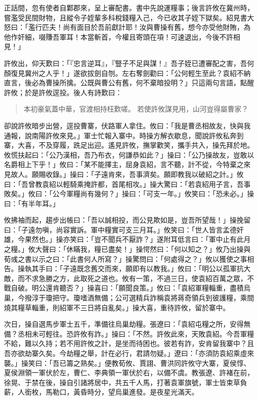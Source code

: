 正話間，忽有使者自鄴郡來，呈上審配書。書中先說運糧事；後言許攸在冀州時，嘗濫受民間財物，且縱令子姪輩多科稅錢糧入己，今已收其子姪下獄矣。紹見書大怒曰：「濫行匹夫！尚有面目於吾前獻計耶！汝與曹操有舊，想今亦受他財賄，為他作奸細，啜賺吾軍耳！本當斬首，今權且寄頭在項！可速退出，今後不許相見！」

許攸出，仰天歎曰：「『忠言逆耳』，『豎子不足與謀！』吾子姪已遭審配之害，吾何顏復見冀州之人乎！」遂欲拔劍自刎。左右奪劍勸曰：「公何輕生至此？袁紹不納直言，後必為曹操所擒。公既與曹公有舊，何不棄暗投明？」只這兩句言語，點醒許攸；於是許攸逕投。後人有詩歎曰：

\begin{quote}
本初豪氣蓋中華，官渡相持枉歎嗟。
若使許攸謀見用，山河豈得屬曹家？
\end{quote}

卻說許攸暗步出營，逕投曹寨，伏路軍人拿住。攸曰：「我是曹丞相故友，快與我通報，說南陽許攸來見。」軍士忙報入寨中。時操方解衣歇息，聞說許攸私奔到寨，大喜，不及穿履，跣足出迎。遙見許攸，撫掌歡笑，攜手共入，操先拜於地。攸慌扶起曰：「公乃漢相，吾乃布衣，何謙恭如此？」操曰：「公乃操故友，豈敢以名爵相上下乎！」攸曰：「某不能擇主，屈身袁紹，言不聽，計不從，今特棄之來見故人。願賜收錄。」操曰：「子遠肯來，吾事濟矣。願即教我以破紹之計。」攸曰：「吾曾教袁紹以輕騎乘掩許都，首尾相攻。」操大驚曰：「若袁紹用子言，吾事敗矣。」攸曰：「公今軍糧尚有幾何？」操曰：「可支一年。」攸笑曰：「恐未必。」操曰：「有半年耳。」

攸拂袖而起，趨步出帳曰：「吾以誠相投，而公見欺如是，豈吾所望哉！」操挽留曰：「子遠勿嗔，尚容實訴。軍中糧實可支三月耳。」攸笑曰：「世人皆言孟德奸雄，今果然也。」操亦笑曰：「豈不聞兵不厭詐？」遂附耳低言曰：「軍中止有此月之糧。」攸大聲曰：「休瞞我，糧已盡矣！」操愕然曰：「何以知之？」攸乃出操與荀彧之書以示之曰：「此書何人所寫？」操驚問曰：「何處得之？」攸以獲使之事相告。操執其手曰：「子遠既念舊交而來，願即有以教我。」攸曰：「明公以孤軍抗大敵，而不求急勝之方，此取死之道也。攸有一策，不過三日，使袁紹百萬之眾，不戰自破。明公還肯聽否？」操喜曰：「願聞良策。」攸曰：「袁紹軍糧輜重，盡積烏巢，今撥淳于瓊把守。瓊嗜酒無備；公可選精兵詐稱袁將蔣奇領兵到彼護糧，乘間燒其糧草輜重，則紹軍不三日將自亂矣。」操大喜，重待許攸，留於寨中。

次日，操自選馬步軍士五千，準備往烏巢劫糧。張遼曰：「袁紹屯糧之所，安得無備？丞相未可輕往。恐許攸有詐。」操曰：「不然。許攸此來，天敗袁紹。今吾軍糧不給，難以久持；若不用許攸之計，是坐而待困也。彼若有詐，安肯留我寨中？且吾亦欲劫寨久矣。今劫糧之舉，計在必行，君請勿疑。」遼曰：「亦須防袁紹乘虛來襲。」操笑曰：「吾已籌之熟矣。」便教荀攸、賈詡、曹洪同許攸守大寨，夏侯惇、夏侯淵領一軍伏於左，曹仁、李典領一軍伏於右，以備不虞。教張遼、許褚在前，徐晃、于禁在後，操自引諸將居中，共五千人馬，打著袁軍旗號，軍士皆束草負薪，人銜枚，馬勒口，黃昏時分，望烏巢進發。是夜星光滿天。

